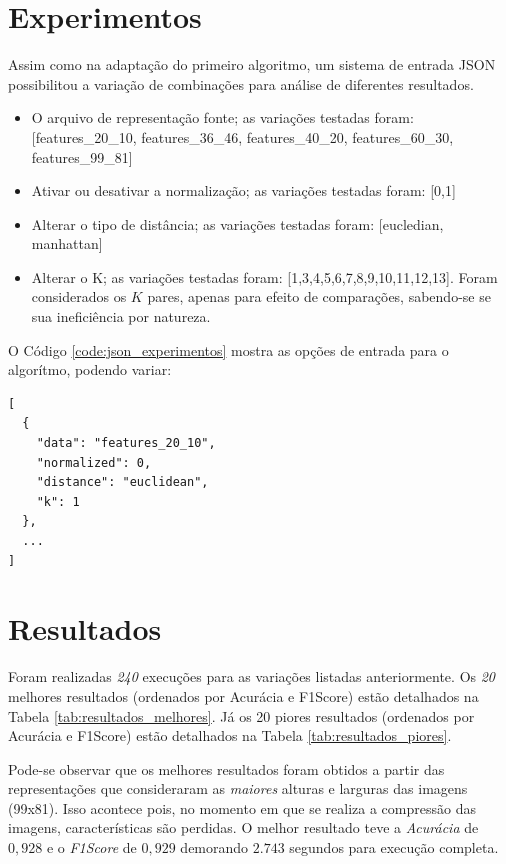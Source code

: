 \documentclass[12pt]{article}
\begin{document}
\section{Experimentos}

Assim como na adaptação do primeiro algoritmo, um sistema de entrada JSON possibilitou a variação de combinações para análise de diferentes resultados.

\begin{itemize}
  \item O arquivo de representação fonte; as variações testadas foram: [features\_20\_10, features\_36\_46, features\_40\_20, features\_60\_30, features\_99\_81]
  \item Ativar ou desativar a normalização; as variações testadas foram: [0,1]
  \item Alterar o tipo de distância; as variações testadas foram: [eucledian, manhattan]
  \item Alterar o K; as variações testadas foram: [1,3,4,5,6,7,8,9,10,11,12,13]. Foram considerados os $K$ pares, apenas para efeito de comparações, sabendo-se se sua ineficiência por natureza.
\end{itemize}

\newpage

O Código \ref{code:json_experimentos} mostra as opções de entrada para o algorítmo, podendo variar:

\begin{lstlisting}[caption={JSON para experimentos},captionpos=b,frame=single,label={code:json_experimentos}]
[
  {
    "data": "features_20_10",
    "normalized": 0,
    "distance": "euclidean",
    "k": 1
  },
  ...
]
\end{lstlisting}

\section{Resultados}

Foram realizadas \textit{240} execuções para as variações listadas anteriormente. Os \textit{20} melhores resultados (ordenados por Acurácia e F1Score) estão detalhados na Tabela \ref{tab:resultados_melhores}. Já os 20 piores resultados (ordenados por Acurácia e F1Score) estão detalhados na Tabela \ref{tab:resultados_piores}.

Pode-se observar que os melhores resultados foram obtidos a partir das representações que consideraram as \textit{maiores} alturas e larguras das imagens (99x81). Isso acontece pois, no momento em que se realiza a compressão das imagens, características são perdidas. O melhor resultado teve a \textit{Acurácia} de $0,928$ e o \textit{F1Score} de $0,929$ demorando $2.743$ segundos para execução completa.
\end{document}

